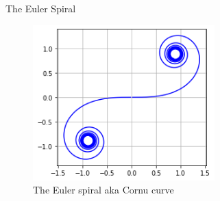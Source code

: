 \documentclass{beamer}
\begin{document}
\begin{frame}{The Euler Spiral}
	\begin{figure}
		\caption{The Euler spiral aka Cornu curve}
		\centering
		\includegraphics[width=70mm, scale=0.5]{euler_spiral.png}
	\end{figure}
	
\end{frame}
\end{document}
